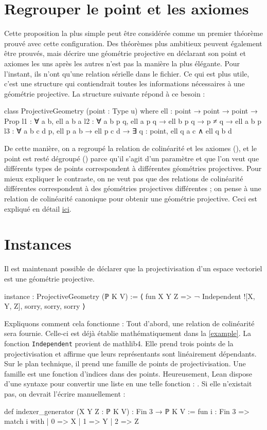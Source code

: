 \documentclass[10pt, oneside]{memoir}
\theoremstyle{definition}
\theoremstyle{remark}
\begin{document}
\section{Regrouper le point et les axiomes}
Cette proposition la plus simple peut être considérée comme un premier théorème
prouvé avec cette configuration. Des théorèmes plus ambitieux peuvent également
être prouvés, mais décrire une géométrie projective en déclarant son point et
axiomes les uns après les autres n'est pas la manière la plus élégante. Pour
l'instant, ils n'ont qu'une relation sérielle dans le fichier. Ce qui est plus
utile, c'est une structure qui contiendrait toutes les informations nécessaires
à une géométrie projective. La structure suivante répond à ce besoin :
\begin{leancode}
class ProjectiveGeometry
  (point : Type u) where
  ell : point → point → point → Prop
  l1  : ∀ a b, ell a b a
  l2  : ∀ a b p q, ell a p q → ell b p q → p ≠ q → ell a b p
  l3  : ∀ a b c d p, ell p a b → ell p c d →
                     ∃ q : point, ell q a c ∧ ell q b d
\end{leancode}
De cette manière, on a regroupé la relation de colinéarité et les axiomes
(), et le point est resté dégroupé () parce qu'il
s'agit d'un paramètre et que l'on veut que différents types de points
correspondent à différentes géométries projectives. Pour mieux expliquer le
contraste, on ne veut pas que des relations de colinéarité différentes
correspondent à des géométries projectives différentes ; on pense à une relation
de colinéarité canonique pour obtenir une géométrie projective. Ceci est
expliqué en détail
\href{https://leanprover.zulipchat.com/#narrow/stream/113489-new-members/topic/Creating.20a.20higher.20level.20object/near/423444220}{ici}.
\section{Instances}
Il est maintenant possible de déclarer que la projectivisation d'un espace
vectoriel est une géométrie projective.
\begin{leancode}
instance : ProjectiveGeometry (ℙ K V) :=
  ⟨
  fun X Y Z => ¬ Independent ![X, Y, Z],
  sorry,
  sorry,
  sorry
  ⟩
\end{leancode}
Expliquons comment cela fonctionne : Tout d'abord, une relation de colinéarité
sera fournie. Celle-ci est déjà établie mathématiquement dans la \cref{example}.
La fonction \texttt{Independent} provient de mathlib4. Elle prend trois points
de la projectivisation et affirme que leurs représentants sont linéairement
dépendants. Sur le plan technique, il prend une famille de points de
projectivisation. Une famille est une fonction d'indices dans des points.
Heureusement, Lean dispose d'une syntaxe pour convertir une liste en une telle
fonction : \say{\texttt{!}}. Si elle n'existait pas, on devrait l'écrire
manuellement :
\begin{leancode}
def indexer_generator
  (X Y Z : ℙ K V) :
    Fin 3 → ℙ K V :=
  fun i : Fin 3 => match i with
  | 0 => X
  | 1 => Y
  | 2 => Z
\end{leancode}
\end{document}
